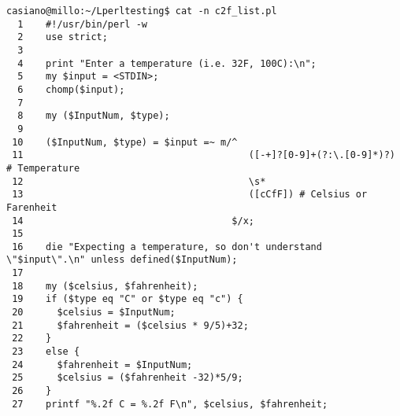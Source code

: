 \begin{latexonly}
\begin{verbatim}
casiano@millo:~/Lperltesting$ cat -n c2f_list.pl
  1    #!/usr/bin/perl -w
  2    use strict;
  3  
  4    print "Enter a temperature (i.e. 32F, 100C):\n";
  5    my $input = <STDIN>;
  6    chomp($input);
  7  
  8    my ($InputNum, $type);
  9  
 10    ($InputNum, $type) = $input =~ m/^
 11                                        ([-+]?[0-9]+(?:\.[0-9]*)?) # Temperature
 12                                        \s*
 13                                        ([cCfF]) # Celsius or Farenheit
 14                                     $/x;
 15  
 16    die "Expecting a temperature, so don't understand \"$input\".\n" unless defined($InputNum);
 17  
 18    my ($celsius, $fahrenheit);
 19    if ($type eq "C" or $type eq "c") {
 20      $celsius = $InputNum;
 21      $fahrenheit = ($celsius * 9/5)+32;
 22    }
 23    else {
 24      $fahrenheit = $InputNum;
 25      $celsius = ($fahrenheit -32)*5/9;
 26    }
 27    printf "%.2f C = %.2f F\n", $celsius, $fahrenheit;
\end{verbatim}
\end{latexonly}
